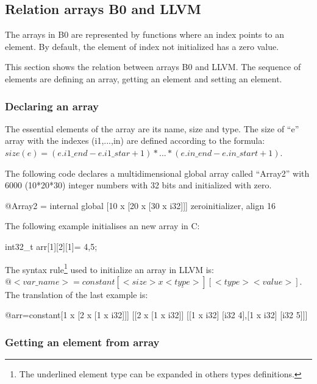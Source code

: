 \subsection{Relation arrays B0 and LLVM}

The arrays in B0 are represented by functions where an index points to an 
element. By default, the element of index not initialized has a zero value. 

This section shows the relation between arrays B0 and LLVM. The sequence of
elements are defining an array, getting an element and setting an
element.

\subsubsection{Declaring an array}


The essential elements of the array are its name, size and type. 
The size of ``e'' array with the indexes (i1,...,in) are defined according 
to the formula:\\
 $size(e) = (e.i1\_end - e.i1\_star+1) * ... * (e.in\_end - e.in\_start+1)$.

The following code declares a multidimensional global array called ``Array2'' 
with 6000 (10*20*30) integer numbers with 32 bits and initialized with zero.

\begin{llvmcode}
@Array2 = internal global [10 x [20 x [30 x i32]]] zeroinitializer, align 16
\end{llvmcode}

The following example initialises an new array in C:

\begin{ccode}
int32_t arr[1][2][1]= {{{4},{5}}};
\end{ccode}

The syntax rule\footnote{The underlined element type can be expanded in others types definitions.} used to initialize an array in LLVM is:\\
$@<var\_name> = constant [<size> x \underline{<type>}] [<type> <value>]$.\\
The translation of the last example is:

\begin{llvmcode}
@arr=constant[1 x [2 x [1 x i32]]] [[2 x [1 x i32]] [[1 x i32] [i32 4],[1 x i32] [i32 5]]]
\end{llvmcode}


\subsubsection{Getting an element from array}

